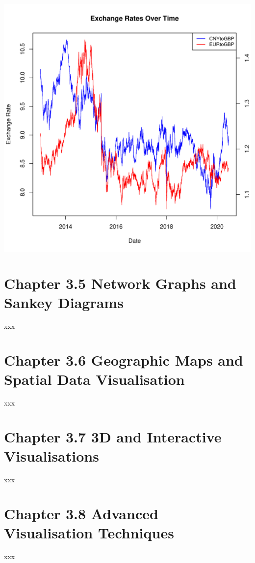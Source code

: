 \documentclass{article}\usepackage[]{graphicx}\usepackage[]{xcolor}
\makeatletter
\def\maxwidth{ %
  \ifdim\Gin@nat@width>\linewidth
    \linewidth
  \else
    \Gin@nat@width
  \fi
}
\newenvironment{knitrout}{}{} %
\makeatother
\begin{document}
\begin{knitrout}
\color{fgcolor}
\includegraphics[width=\maxwidth]{figure/unnamed-chunk-4-1} 
\end{knitrout}


\section{Chapter 3.5 Network Graphs and Sankey Diagrams}
xxx

\section{Chapter 3.6 Geographic Maps and Spatial Data Visualisation}
xxx

\section{Chapter 3.7 3D and Interactive Visualisations}
xxx

\section{Chapter 3.8 Advanced Visualisation Techniques}
xxx
\end{document}
